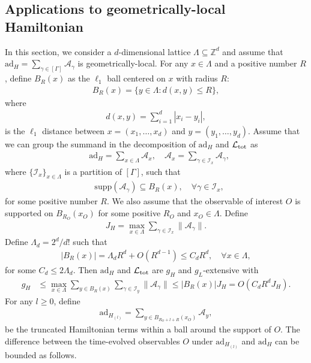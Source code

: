 \documentclass[aps,pra,reprint,groupedaddress,floatfix]{revtex4-2}
\renewcommand{\L}{\mathcal{L}}
\newcommand{\ad}{\mathrm{ad}}
\newcommand{\A}{\mathcal{A}}
\newcommand{\supp}{\mathrm{supp}}
\newcommand{\mc}{\mathcal}
\begin{document}
\subsection{Applications to geometrically-local Hamiltonian}
\label{sec:geo-local}
In this section, we consider a $d$-dimensional lattice $\Lambda \subseteq \mathbb{Z}^d$ and assume that $\ad_H = \sum_{\gamma\in [\Gamma]} \A_{\gamma}$ is geometrically-local. 
For any $x\in \Lambda$ and a positive number $R$, define $B_R(x)$ as the $\ell_1$ ball centered on $x$ with radius $R$: \begin{align*}
    B_R(x) = \{ y\in \Lambda:d(x,y) \le R\},
\end{align*}
where \begin{align*}
    d(x,y) = \sum_{i=1}^d  |x_i-y_i|,
\end{align*}
is the $\ell_1$ distance between $x = (x_1, \ldots, x_d)$ and $y= (y_1, \ldots, y_d)$. 
Assume that we can group the summand in the decomposition of $\ad_H$ and $\L_{\rm tot}$ as \begin{align*}
    &\ad_H = \sum_{x\in {\Lambda}} \A_x, \quad \A_x = \sum_{\gamma\in \mc I_x} \A_{\gamma},
\end{align*} where $\{\mc I_x\}_{x\in \Lambda}$ is a partition of $[\Gamma]$, such that \begin{align*}
    &\supp(\A_{\gamma}) \subseteq B_R(x), \quad \forall \gamma\in \mc I_x,
\end{align*} for some positive number $R$. We also assume that the observable of interest $O$ is supported on $B_{R_O}(x_O)$ for some positive $R_O$ and $x_O\in \Lambda$. Define \begin{align*}
    J_H = \max_{x\in \Lambda}\sum_{\gamma\in \mc I_x} \|\A_{\gamma}\|.
\end{align*} Define $\Lambda_d = 2^d/d!$ such that \begin{align*}
    |B_R(x)| = \Lambda_dR^d + O(R^{d-1})\le C_d R^d, \quad \forall x\in \Lambda,
\end{align*}
for some $C_d\le 2\Lambda_d$.
Then $\ad_H$ and $\L_{\rm tot}$ are $g_H$ and $g_L$-extensive with \begin{align*}
    g_H &\le \max_{x\in \Lambda} \sum_{y\in B_R(x)}\sum_{\gamma\in \mc I_y} \|\A_{\gamma}\|\le |B_R(x)|J_H  = O(C_d R^d J_H).
\end{align*}
For any $l \ge 0$, define\begin{align*}
    \ad_{H_{(l)}} = \sum_{y\in B_{R_O+l+R}(x_O)} \A_y,
\end{align*}
be the truncated Hamiltonian terms within a ball around the support of $O$. The difference between the time-evolved observables $O$ under $\ad_{H_{(l)}}$ and $ \ad_H$ can be bounded as follows. 
\end{document}
